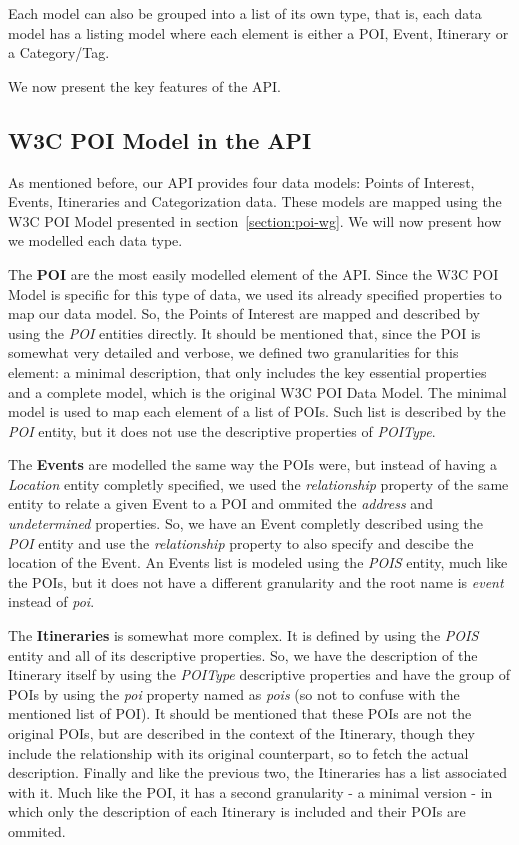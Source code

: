 \documentclass[times,doublespace]{ettauth}%
\begin{document}
Each model can also be grouped into a list of its own type, that is, each data model has a listing model where each element is either a \ac{POI}, Event, Itinerary or a Category/Tag.

We now present the key features of the API.

\subsection{W3C POI Model in the API}
\label{section:w3cpoi}
As mentioned before, our API provides four data models: Points of Interest, Events, Itineraries and Categorization data. These models are mapped using the W3C POI Model presented in section~\ref{section:poi-wg}. We will now present how we modelled each data type.

The \textbf{\acf{POI}} are the most easily modelled element of the API. Since the W3C POI Model is specific for this type of data, we used its already specified properties to map our data model. So, the Points of Interest are mapped and described by using the \textit{POI} entities directly. It should be mentioned that, since the \ac{POI} is somewhat very detailed and verbose, we defined two granularities for this element: a minimal description, that only includes the key essential properties and a complete model, which is the original W3C POI Data Model. The minimal model is used to map each element of a list of \acp{POI}. Such list is described by the \textit{POI} entity, but it does not use the descriptive properties of \textit{POIType}.

The \textbf{Events} are modelled the same way the \acp{POI} were, but instead of having a \textit{Location} entity completly specified, we used the \textit{relationship} property of the same entity to relate a given Event to a \ac{POI} and ommited the \textit{address} and \textit{undetermined} properties. So, we have an Event completly described using the \textit{POI} entity and use the \textit{relationship} property to also specify and descibe the location of the Event. An Events list is modeled using the \textit{POIS} entity, much like the \acp{POI}, but it does not have a different granularity and the root name is \textit{event} instead of \textit{poi}.

The \textbf{Itineraries} is somewhat more complex. It is defined by using the \textit{POIS} entity and all of its descriptive properties. So, we have the description of the Itinerary itself by using the \textit{POIType} descriptive properties and have the group of \acp{POI} by using the \textit{poi} property named as \textit{pois} (so not to confuse with the mentioned list of \ac{POI}). It should be mentioned that these \acp{POI} are not the original \acp{POI}, but are described in the context of the Itinerary, though they include the relationship with its original counterpart, so to fetch the actual description. Finally and like the previous two, the Itineraries has a list associated with it. Much like the \ac{POI}, it has a second granularity - a minimal version - in which only the description of each Itinerary is included and their \acp{POI} are ommited.
\end{document}
